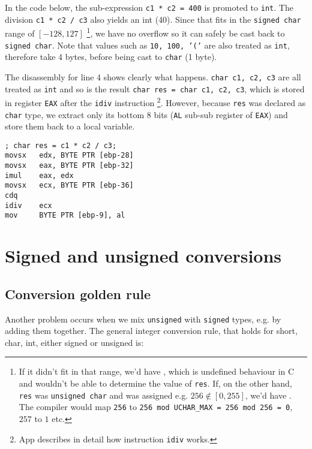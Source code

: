 In the code below, the sub-expression \texttt{c1 * c2 = 400} is promoted to \texttt{int}. The division \texttt{c1 * c2 / c3} also yields an int (40). Since that fits in the \texttt{signed char} range of $[-128, 127]$ \footnote{If it didn't fit in that range, we'd have , which is undefined behaviour in C and wouldn't be able to determine the value of \texttt{res}. If, on the other hand, \texttt{res} was \texttt{unsigned char} and was assigned e.g. $256\notin [0,255]$, we'd have . The compiler would map \texttt{256} to \texttt{256 mod UCHAR\_MAX = 256 mod 256 = 0}, $257$ to $1$ etc.}, we have no overflow so it can safely be cast back to \texttt{signed char}. Note that values such as \texttt{10, 100, '('} are also treated as \texttt{int}, therefore take 4 bytes, before being cast to \texttt{char} (1 byte).



The disassembly for line 4 shows clearly what happens. \texttt{char c1, c2, c3} are all treated as \texttt{int} and so is the result \texttt{char res = char c1, c2, c3}, which is stored in register \texttt{EAX} after the \texttt{idiv} instruction \footnote{App \TODO describes in detail how instruction \texttt{idiv} works.}. However, because \texttt{res} was declared as \texttt{char} type, we extract only its bottom 8 bits (\texttt{AL} sub-sub register of \texttt{EAX}) and store them back to a local variable.

\begin{verbatim}
; char res = c1 * c2 / c3;
movsx   edx, BYTE PTR [ebp-28]
movsx   eax, BYTE PTR [ebp-32]
imul    eax, edx
movsx   ecx, BYTE PTR [ebp-36]
cdq
idiv    ecx
mov     BYTE PTR [ebp-9], al
\end{verbatim}


\section{Signed and unsigned conversions}


\subsection{Conversion golden rule}

Another problem occurs when we mix \texttt{unsigned} with \texttt{signed} types, e.g. by adding them together. The general integer conversion rule, that holds for short, char, int, either signed or unsigned is:

